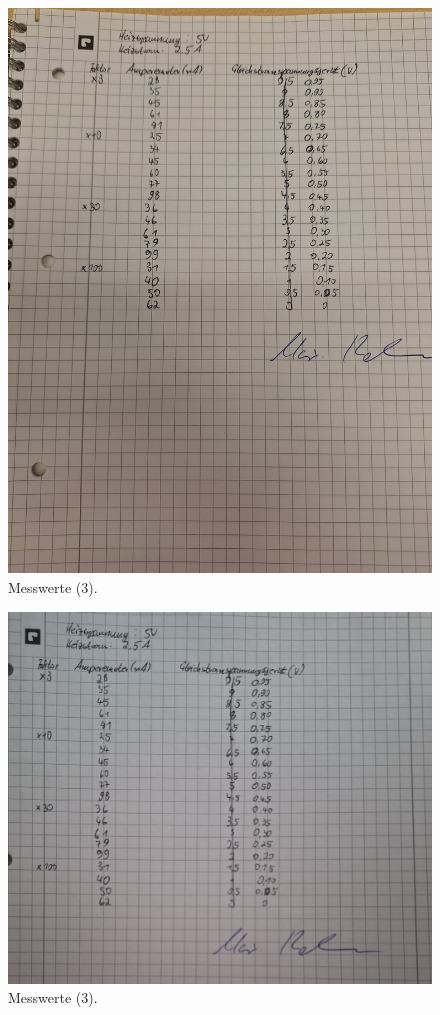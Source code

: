 \begin{figure}
    \caption{Messwerte (3).}
    \centering
    \includegraphics[width=\textwidth,angle=-90]{"Bilder/mw3.jpg"}
\end{figure}
\begin{figure}
    \caption{Messwerte (3).}
    \centering
    \includegraphics[width=\textwidth,angle=-90]{"Bilder/mw4.jpg"}
\end{figure}